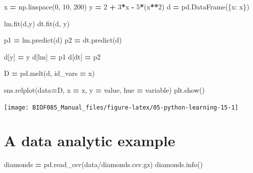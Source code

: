 \documentclass[
  letterpaper,
]{scrbook}
\newenvironment{Shaded}{\begin{snugshade}}{\end{snugshade}}
\newcommand{\DecValTok}[1]{\textcolor[rgb]{0.00,0.00,0.81}{#1}}
\newcommand{\NormalTok}[1]{#1}
\newcommand{\OperatorTok}[1]{\textcolor[rgb]{0.81,0.36,0.00}{\textbf{#1}}}
\newcommand{\StringTok}[1]{\textcolor[rgb]{0.31,0.60,0.02}{#1}}
\begin{document}
\begin{Shaded}
\begin{Highlighting}[]
\NormalTok{x }\OperatorTok{=}\NormalTok{ np.linspace(}\DecValTok{0}\NormalTok{, }\DecValTok{10}\NormalTok{, }\DecValTok{200}\NormalTok{)}
\NormalTok{y }\OperatorTok{=} \DecValTok{2} \OperatorTok{+} \DecValTok{3}\OperatorTok{*}\NormalTok{x }\OperatorTok{{-}} \DecValTok{5}\OperatorTok{*}\NormalTok{(x}\OperatorTok{**}\DecValTok{2}\NormalTok{)}
\NormalTok{d }\OperatorTok{=}\NormalTok{ pd.DataFrame(\{}\StringTok{\textquotesingle{}x\textquotesingle{}}\NormalTok{: x\})}

\NormalTok{lm.fit(d,y)}
\NormalTok{dt.fit(d, y)}

\NormalTok{p1 }\OperatorTok{=}\NormalTok{ lm.predict(d)}
\NormalTok{p2 }\OperatorTok{=}\NormalTok{ dt.predict(d)}

\NormalTok{d[}\StringTok{\textquotesingle{}y\textquotesingle{}}\NormalTok{] }\OperatorTok{=}\NormalTok{ y}
\NormalTok{d[}\StringTok{\textquotesingle{}lm\textquotesingle{}}\NormalTok{] }\OperatorTok{=}\NormalTok{ p1}
\NormalTok{d[}\StringTok{\textquotesingle{}dt\textquotesingle{}}\NormalTok{] }\OperatorTok{=}\NormalTok{ p2}

\NormalTok{D }\OperatorTok{=}\NormalTok{ pd.melt(d, id\_vars }\OperatorTok{=} \StringTok{\textquotesingle{}x\textquotesingle{}}\NormalTok{)}

\NormalTok{sns.relplot(data}\OperatorTok{=}\NormalTok{D, x }\OperatorTok{=} \StringTok{\textquotesingle{}x\textquotesingle{}}\NormalTok{, y }\OperatorTok{=} \StringTok{\textquotesingle{}value\textquotesingle{}}\NormalTok{, hue }\OperatorTok{=} \StringTok{\textquotesingle{}variable\textquotesingle{}}\NormalTok{)}
\NormalTok{plt.show()}
\end{Highlighting}
\end{Shaded}

\begin{center}\texttt{[image: BIOF085\_Manual\_files/figure-latex/05-python-learning-15-1]} \end{center}

\hypertarget{a-data-analytic-example}{%
\section{A data analytic example}\label{a-data-analytic-example}}

\begin{Shaded}
\begin{Highlighting}[]
\NormalTok{diamonds }\OperatorTok{=}\NormalTok{ pd.read\_csv(}\StringTok{\textquotesingle{}data/diamonds.csv.gz\textquotesingle{}}\NormalTok{)}
\NormalTok{diamonds.info()}
\end{Highlighting}
\end{Shaded}
\end{document}
